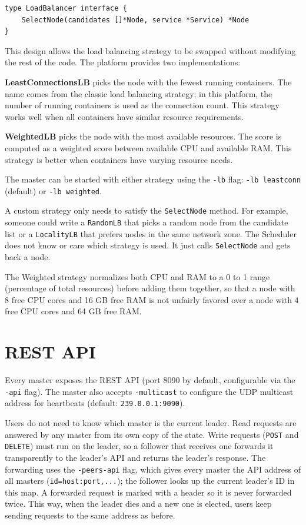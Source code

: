 \begin{verbatim}
type LoadBalancer interface {
    SelectNode(candidates []*Node, service *Service) *Node
}
\end{verbatim}

This design allows the load balancing strategy to be swapped without modifying the rest of the code. The platform provides two implementations:

\textbf{LeastConnectionsLB} picks the node with the fewest running containers. The name comes from the classic load balancing strategy; in this platform, the number of running containers is used as the connection count. This strategy works well when all containers have similar resource requirements.

\textbf{WeightedLB} picks the node with the most available resources. The score is computed as a weighted score between available CPU and available RAM. This strategy is better when containers have varying resource needs.

The master can be started with either strategy using the \texttt{-lb} flag: \texttt{-lb leastconn} (default) or \texttt{-lb weighted}.

A custom strategy only needs to satisfy the \texttt{SelectNode} method. For example, someone could write a \texttt{RandomLB} that picks a random node from the candidate list or a \texttt{LocalityLB} that prefers nodes in the same network zone. The Scheduler does not know or care which strategy is used. It just calls \texttt{SelectNode} and gets back a node.

The Weighted strategy normalizes both CPU and RAM to a 0 to 1 range (percentage of total resources) before adding them together, so that a node with 8 free CPU cores and 16 GB free RAM is not unfairly favored over a node with 4 free CPU cores and 64 GB free RAM.

\section{REST API}

Every master exposes the REST API (port 8090 by default, configurable via the \texttt{-api} flag). The master also accepts \texttt{-multicast} to configure the UDP multicast address for heartbeats (default: \texttt{239.0.0.1:9090}).

Users do not need to know which master is the current leader. Read requests are answered by any master from its own copy of the state. Write requests (\texttt{POST} and \texttt{DELETE}) must run on the leader, so a follower that receives one forwards it transparently to the leader's API and returns the leader's response. The forwarding uses the \texttt{-peers-api} flag, which gives every master the API address of all masters (\texttt{id=host:port,...}); the follower looks up the current leader's ID in this map. A forwarded request is marked with a header so it is never forwarded twice. This way, when the leader dies and a new one is elected, users keep sending requests to the same address as before.

